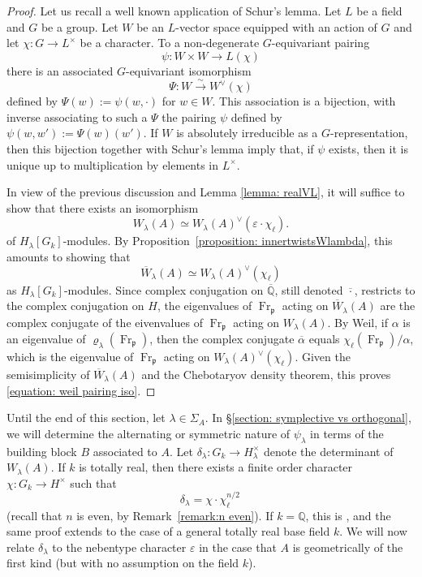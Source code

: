 \documentclass[oneside]{amsart}
\theoremstyle{remark}
\newcommand{\Q}{\mathbb Q}
\newcommand{\Qbar}{{\overline{\mathbb Q}}}
\newcommand{\Frob}{\operatorname{Fr}}
\newcommand{\p}{\mathfrak{p}}
\numberwithin{equation}{section}
\begin{document}
\begin{proof}
Let us recall a well known application of Schur's lemma. Let $L$ be a field and $G$ be a group. Let $W$ be an $L$-vector space equipped with an action of $G$ and let $\chi:G\rightarrow L^\times$ be a character. To a non-degenerate $G$-equivariant pairing
$$
\psi: W \times W \rightarrow L(\chi)
$$
there is an associated $G$-equivariant isomorphism
$$
\Psi: W\stackrel{\sim}{\longrightarrow } W^\vee(\chi)
$$
defined by $\Psi(w):=\psi(w,\cdot)$ for $w\in W$. This association is a bijection, with inverse associating to such a $\Psi$ the pairing $\psi$ defined by $\psi(w,w'):=\Psi(w)(w')$. 
If $W$ is absolutely irreducible as a $G$-representation, then this bijection together with Schur's lemma imply that, if $\psi$ exists, then it is unique up to multiplication by elements in $L^\times$.  

In view of the previous discussion and Lemma \ref{lemma: realVL}, it will suffice to show that there exists an isomorphism
\begin{equation}\label{equation: weilpairing}
W_\lambda(A)\simeq W_\lambda(A)^\vee(\varepsilon\cdot \chi_\ell).
\end{equation}
of $H_\lambda[G_k]$-modules. By Proposition~\ref{proposition: innertwistsWlambda}, this amounts to showing that
\begin{equation}\label{equation: weil pairing iso}
\overline W_\lambda(A)\simeq W_\lambda(A)^\vee(\chi_\ell)
\end{equation}
as $H_\lambda[G_k]$-modules. Since complex conjugation on $\Qbar$,  still denoted $\overline{\cdot }$,  restricts to the complex conjugation  on $H$, the eigenvalues of  $\Frob_\p$ acting on $\overline W_\lambda(A)$ are the complex conjugate of the eivenvalues of  $\Frob_\p$ acting on $ W_\lambda(A)$. By Weil, if $\alpha$ is an eigenvalue of $\varrho_\lambda(\Frob_\p)$, then the complex conjugate $\overline \alpha$ equals $ \chi_\ell(\Frob_\p)/\alpha$, which is the eigenvalue of $\Frob_\p$ acting on $  W_\lambda(A)^\vee(\chi_\ell) $. Given the semisimplicity of $\overline W_\lambda(A)$ and the Chebotaryov density theorem, this proves \eqref{equation: weil pairing iso}.

\end{proof}

Until the end of this section, let $\lambda\in \Sigma_A$. In \S\ref{section: symplective vs orthogonal}, we will determine the alternating or symmetric nature of $\psi_\lambda$ in terms of the building block $B$ associated to $A$. Let $\delta_\lambda:G_k\rightarrow H_\lambda^\times$ denote the determinant of $W_\lambda(A)$.  If $k$ is totally real, then there exists a finite order character $\chi\colon G_k\rightarrow H^\times$ such that
$$
\delta_\lambda =\chi\cdot \chi_\ell^{n/2}\,
$$
(recall that $n$ is even, by Remark~\ref{remark:n even}).
If $k=\Q$, this is \cite[Prop. 5.9]{Chi87}, and the same proof extends to the case of a general totally real base field $k$. We will now relate $\delta_\lambda$ to the nebentype character $\varepsilon$ in the case that $A$ is geometrically of the first kind (but with no assumption on the field $k$).
\end{document}

